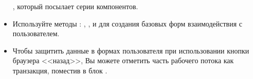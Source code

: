 \documentclass[a4paper,10pt,twoside]{book}
\begin{document}
\begin{itemize}
, который посылает  серии компонентов.
\item Используйте методы : , ,
 и  для создания базовых форм
взаимодействия с пользователем.
\item Чтобы защитить данные в формах пользователя при использовании
кнопки браузера <<назад>>, Вы можете отметить часть рабочего потока как
транзакция, поместив в блок .
\end{itemize}

\ifx\wholebook\relax\else 
   
   
\end{document}
